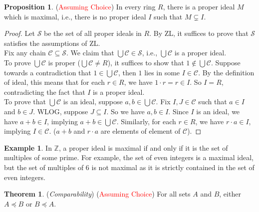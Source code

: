 \documentclass[14pt]{article}
\theoremstyle{definition}
\newtheorem*{example}{Example}
\newtheorem{proposition}[definition]{Proposition}
\newtheorem{theorem}[definition]{Theorem}
\newcommand{\bb}[1]{\mathbb{#1}}
\begin{document}
\begin{proposition}
    (\textcolor{red}{Assuming Choice}) In every ring $R$, there is a proper ideal $M$ 
    which is maximal, i.e., there is no proper ideal $I$ such that $M\subsetneq I$.
\end{proposition}

\begin{proof}
   Let $\mathcal{S}$ be the set of all proper ideals in $R$. By ZL, it suffices to prove that 
   $\mathcal{S}$ satisfies the assumptions of ZL.\\
   Fix any chain $\mathcal{C}\subseteq \mathcal{S}$. We claim that $\bigcup \mathcal{C}
   \in \mathcal{ S}$, i.e., $\bigcup \mathcal{C}$ is a proper ideal.\\
   To prove $\bigcup \mathcal{C}$ is proper ($\bigcup \mathcal{C}\not=R$), it suffices to 
   show that $1\not\in \bigcup \mathcal{C}$. Suppose towards a contradiction that $1\in
   \bigcup \mathcal{C}$, then $1$ lies in some $I\in\mathcal{C}$. By the definition of 
   ideal, this means that for each $r\in R$, we have $1\cdot r=r\in I$. So $I=R$, 
   contradicting the fact that $I$ is a proper ideal.\\
   To prove that $\bigcup \mathcal{C}$ is an ideal, suppose $a,b\in \bigcup \mathcal{C}$.
   Fix $I,J\in \mathcal{ C}$ such that $a\in I$ and $b\in J$. WLOG, suppose $J\subseteq I$.
   So we have $a,b\in I$. Since $I$ is an ideal, we have $a+b\in I$, implying $a+b\in
   \bigcup \mathcal{C}$. Similarly, for each $r\in R$, we have $r\cdot a\in I$, implying
    $I\in \mathcal{C}$. ($a+b$ and $r\cdot a$ are elements of element of $\mathcal{C}$).

\end{proof}

\begin{example}
    In $\bb{Z}$, a proper ideal is maximal if and only if it is the set of multiples of some 
    prime. For example, the set of even integers is a maximal ideal, but the set of multiples
    of 6 is not maximal as it is strictly contained in the set of even integers.
\end{example}


\vspace{2mm}

\begin{theorem}
    (\textit{Comparability}) (\textcolor{red}{Assuming Choice}) 
    For all sets $A$ and $B$, either $A\preceq B$ or $B\preceq A$.
\end{theorem}
\end{document}
